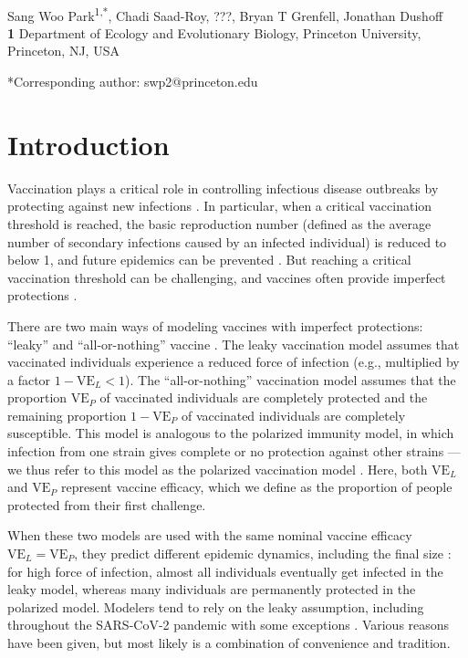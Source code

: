 \documentclass[12pt]{article}
\date{\today}
\newcommand{\VE}{\ensuremath{\textrm{VE}}}
\begin{document}
\begin{flushleft}{
	\Large
	\textbf{}
}
\newline
\\
Sang Woo Park\textsuperscript{1,*}, Chadi Saad-Roy, ???, Bryan T Grenfell, Jonathan Dushoff
\\
\bigskip
\textbf{1} Department of Ecology and Evolutionary Biology, Princeton University, Princeton, NJ, USA
\\
\bigskip

*Corresponding author: swp2@princeton.edu
\end{flushleft}

\section*{Introduction}

Vaccination plays a critical role in controlling infectious disease outbreaks by protecting against new infections \citep{iwasaki2020and}.
In particular, when a critical vaccination threshold is reached, the basic reproduction number (defined as the average number of secondary infections caused by an infected individual) is reduced to below 1, and future epidemics can be prevented \citep{anderson1985vaccination}.
But reaching a critical vaccination threshold can be challenging, and vaccines often provide imperfect protections \citep{gandon2003imperfect,anderson2020challenges}.

There are two main ways of modeling vaccines with imperfect protections: ``leaky'' and ``all-or-nothing'' vaccine \citep{smith1984assessment}.
The leaky vaccination model assumes that vaccinated individuals experience a reduced force of infection (e.g., multiplied by a factor $1-\VE_L < 1$).
The ``all-or-nothing'' vaccination model assumes that the proportion $\VE_P$ of vaccinated individuals are completely protected and the remaining proportion $1-\VE_P$ of vaccinated individuals are completely susceptible.
This model is analogous to the polarized immunity model, in which infection from one strain gives complete or no protection against other strains \citep{gog2002dynamics}---we thus refer to this model as the polarized vaccination model \citep{gomes2014missing}.
Here, both $\VE_L$ and $\VE_P$ represent vaccine efficacy, which we define as the proportion of people protected from their first challenge.

When these two models are used with the same nominal vaccine efficacy $\VE_L = \VE_P$, they predict different epidemic dynamics, including the final size \citep{smith1984assessment}:
for high force of infection, almost all individuals eventually get infected in the leaky model, whereas many individuals are permanently protected in the polarized model.
Modelers tend to rely on the leaky assumption, including throughout the SARS-CoV-2 pandemic \citep{dyson2021possible,gozzi2021importance,marziano2021vaccine,matrajt2021vaccine,park2022intermediate} with some exceptions \citep{bubar2021model,buckner2021dynamic}.
Various reasons have been given, but most likely is a combination of convenience and tradition.
\end{document}
